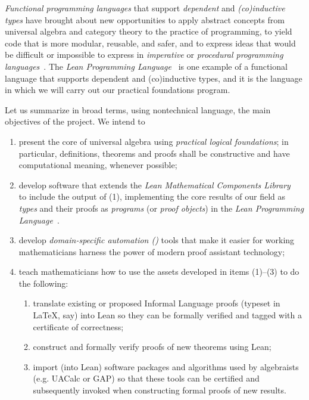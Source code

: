 \documentclass[11pt]{amsart}  %
\begin{document}
\emph{Functional programming languages} that support \emph{dependent} and \emph{(co)inductive types} have brought about new opportunities to apply abstract concepts from universal algebra and category theory to the practice of programming, to yield code that is more modular, reusable, and safer, and to express ideas that would be difficult or impossible to express in \emph{imperative} or \emph{procedural programming languages}~\cite[Chs. 5 \& 10]{baueroplss:2018,hughes:1989,chiusano:2014}. The \emph{Lean Programming Language}~\cite{lean} is one example of a functional language that supports dependent and (co)inductive types, and it is the language in which we will carry out our practical foundations program.

Let us summarize in broad terms, using nontechnical language, the main objectives of the project. We intend to
\begin{enumerate}
  \item present the core of universal algebra using \emph{practical logical foundations}; in particular, definitions, theorems and proofs shall be constructive and have computational meaning, whenever possible;
  
  \item develop software that extends the \emph{Lean Mathematical Components Library}~\cite{lean-mathlib:2018} to include the output of (1), implementing the core results of our field as \emph{types} and their proofs as \emph{programs} (or \emph{proof objects}) in the \emph{Lean Programming Language}~\cite{lean,lean-ualib}.
        
  \item develop \emph{domain-specific automation (\dsa)} tools that make it easier for working mathematicians harness the power of modern proof assistant technology;
        
  \item teach mathematicians how to use the assets developed in items (1)--(3)
        to do the following:
  \begin{enumerate}[{\bf a.}]
    \item translate existing or proposed Informal Language proofs (typeset in \LaTeX, say) into Lean so they can be formally verified and tagged with a certificate of correctness;
    \item construct and formally verify proofs of new theorems using Lean;
    \item import (into Lean) software packages and algorithms used by algebraists 
    (e.g. UACalc or GAP) so that these tools can be certified and subsequently 
    invoked when constructing formal proofs of new results.
  \end{enumerate}
\end{enumerate}
\end{document}

